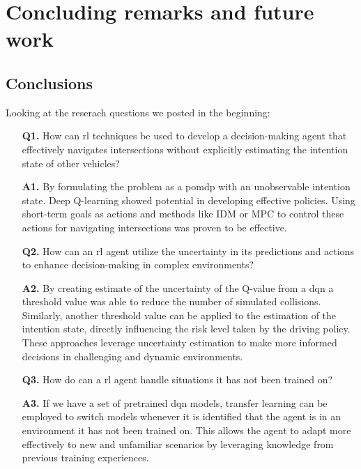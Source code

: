 \chapter{Concluding remarks and future work}
\section{Conclusions}\label{sec:conclusion}
Looking at the reserach questions we posted in the beginning: 
\begin{enumerate}
	\item[\textbf{Q1.}] How can \gls{rl} techniques be used to develop a decision-making agent that effectively navigates intersections without explicitly estimating the intention state of other vehicles? 
	\item[\textbf{A1.}]By formulating the problem as a \gls{pomdp} with an unobservable intention state. Deep Q-learning showed potential in developing effective policies. Using short-term goals as actions and methods like IDM or MPC to control these actions for navigating intersections was proven to be effective.
	\item[\textbf{Q2.}] How can an \gls{rl} agent utilize the uncertainty in its predictions and actions to enhance decision-making in complex environments? 
	\item[\textbf{A2.}] By creating estimate of the uncertainty of the Q-value from a \gls{dqn} a threshold value was able to reduce the number of simulated collisions. Similarly, another threshold  value can be applied to the estimation of the intention state, directly influencing the risk level taken by the driving policy. These approaches leverage uncertainty estimation to make more informed decisions in challenging and dynamic environments.
	\item[\textbf{Q3.}] How do can a \gls{rl} agent handle situations it has not been trained on? 
	\item[\textbf{A3.}] If we have a set of pretrained \gls{dqn} models, transfer learning can be employed to switch models whenever it is identified that the agent is in an environment it has not been trained on. This allows the agent to adapt more effectively to new and unfamiliar scenarios by leveraging knowledge from previous training experiences.
\end{enumerate}



